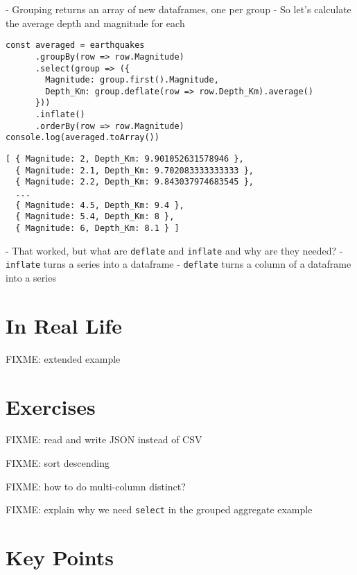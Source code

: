 -   Grouping returns an array of new dataframes, one per group
-   So let's calculate the average depth and magnitude for each

\begin{verbatim}
const averaged = earthquakes
      .groupBy(row => row.Magnitude)
      .select(group => ({
        Magnitude: group.first().Magnitude,
        Depth_Km: group.deflate(row => row.Depth_Km).average()
      }))
      .inflate()
      .orderBy(row => row.Magnitude)
console.log(averaged.toArray())
\end{verbatim}

\begin{verbatim}
[ { Magnitude: 2, Depth_Km: 9.901052631578946 },
  { Magnitude: 2.1, Depth_Km: 9.702083333333333 },
  { Magnitude: 2.2, Depth_Km: 9.843037974683545 },
  ...
  { Magnitude: 4.5, Depth_Km: 9.4 },
  { Magnitude: 5.4, Depth_Km: 8 },
  { Magnitude: 6, Depth_Km: 8.1 } ]
\end{verbatim}

-   That worked, but what are \texttt{deflate} and \texttt{inflate} and why are they needed?
-   \texttt{inflate} turns a series into a dataframe
-   \texttt{deflate} turns a column of a dataframe into a series


\section{In Real Life}\label{s:dataforge-real}

FIXME: extended example

\section{Exercises}\label{s:dataforge-exercises}

FIXME: read and write JSON instead of CSV

FIXME: sort descending

FIXME: how to do multi-column distinct?

FIXME: explain why we need \texttt{select} in the grouped aggregate example

\section*{Key Points}


